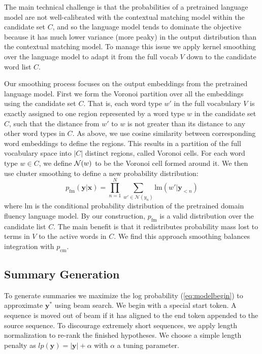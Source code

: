\documentclass[11pt,a4paper]{article}
\newcommand{\bx}{\mathbf{x}}
\newcommand{\by}{\mathbf{y}}
\newcommand{\ps}{p_{\mathrm{cm}}}
\newcommand{\pl}{p_{\mathrm{fm}}}
\begin{document}
The main technical challenge is that the probabilities of a pretrained language model are not well-calibrated with the contextual matching model within the candidate set $C$, and so the language model tends to dominate the objective because it has much lower variance (more peaky) in the output distribution than the contextual matching model. To manage this issue we apply kernel smoothing over the language model to adapt it from the full vocab $V$ down to the candidate word list $C$. 

Our smoothing process focuses on the output embeddings from the pretrained language model. First we form the Voronoi partition \cite{aurenhammer1991voronoi} over all the embeddings using the candidate set $C$. That is, each word type $w'$ in the full vocabulary $V$ is exactly assigned to one region represented by a word type $w$ in the candidate set $C$, such that the distance from $w'$ to $w$ is not greater than its distance to any other word types in $C$. As above, we use cosine similarity between corresponding word embeddings to define the regions. This results in a partition of the full vocabulary space into $|C|$ distinct regions, called Voronoi cells. For each word type $w\in C$, we define ${\cal N}(w)$ to be the Voronoi cell formed around it.
We then use cluster smoothing to define a new probability distribution:
\begin{equation*}
    \pl(\by | \bx)=\prod_{n=1}^N \sum_{w'\in\mathcal{N}(y_n)}\mathrm{lm}(w'|\by_{<n})
\end{equation*}
\noindent
where $\mathrm{lm}$ is the conditional probability distribution of the pretrained domain fluency language model.
By our construction, $\pl$ is a valid distribution over the candidate list $C$.
The main benefit is that it redistributes probability mass lost to terms in $V$ to the active words in $C$. 
We find this approach smoothing balances integration with $\ps$. 

\subsection{Summary Generation}

To generate summaries we maximize the log probability (\ref{eq:modelbegin}) to approximate $\by^*$ using beam search. We begin with a special start token.
A sequence is moved out of beam if it has aligned to the end token appended to the source sequence. To discourage extremely short sequences, we apply length normalization to re-rank the finished hypotheses. We choose a simple length penalty as $lp(\by)=|\by| + \alpha$ with $\alpha$ a tuning parameter. 
\end{document}
